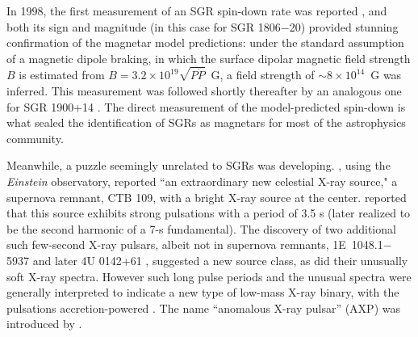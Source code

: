 \documentclass[letterpaper]{ar-1col}
\begin{document}

In 1998, the first measurement of an SGR spin-down rate was reported \citep{kds+98}, and both
its sign and magnitude (in this case for SGR 1806$-$20) provided stunning confirmation 
of the magnetar model predictions:
under the standard assumption of a magnetic dipole braking, in which the surface
dipolar magnetic field strength $B$ is estimated from $B = 3.2 \times 10^{19} \sqrt{P \dot{P}}$~G,
a field strength of $\sim 8 \times 10^{14}$~G was inferred.
This measurement was followed shortly thereafter by an analogous one for SGR 1900+14 \citep{ksh+99}.
The direct measurement of the model-predicted spin-down is what sealed the identification of
SGRs as magnetars for most of the astrophysics community.



Meanwhile, a puzzle seemingly unrelated to SGRs was developing.
\citet{gf80}, using the {\it Einstein} observatory, reported ``an extraordinary
new celestial X-ray source," a supernova remnant, CTB 109, with a bright X-ray source
at the center.  \citet{fg81} reported that this
source exhibits strong pulsations with a period of 3.5 s (later realized to be the
second harmonic of a 7-s fundamental).
The discovery of two additional such few-second X-ray pulsars, albeit not in supernova remnants,
1E~1048.1$-$5937 \citep{scs86} and later
4U 0142+61 \citep{hel94,ims94}, suggested a new source class, as did their 
unusually soft X-ray spectra.  However
such long pulse periods and the unusual spectra were generally interpreted to indicate a 
new type of low-mass X-ray binary, with the pulsations accretion-powered \citep[e.g.][]{ms95,smi96}.
The name ``anomalous X-ray pulsar'' (AXP) was introduced by \citet{vtv95}.
\end{document}
